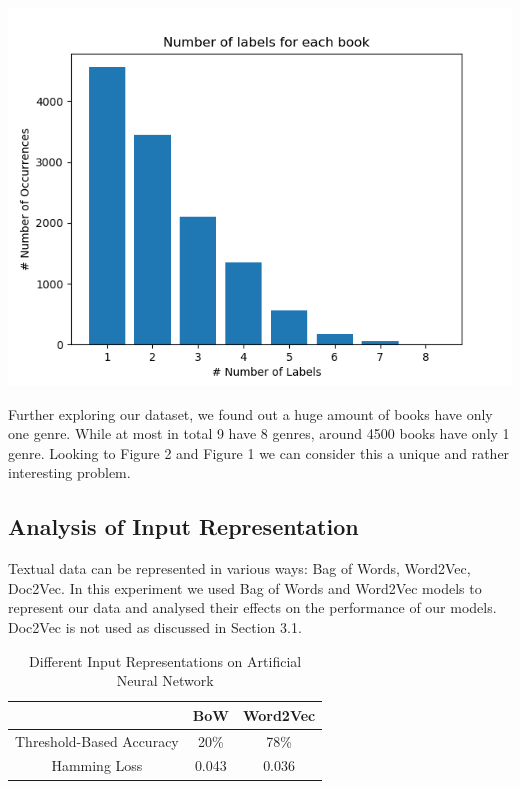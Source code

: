 \documentclass[10pt,twocolumn,letterpaper]{article}
\begin{document}
\includegraphics[width=1\linewidth]{LabelDistribution}

Further exploring our dataset, we found out a huge amount of books have only one genre. While at most in total 9 have 8 genres, around 4500 books have only 1 genre. Looking to Figure 2 and Figure 1 we can consider this a unique and rather interesting problem.

\subsection{Analysis of Input Representation}

Textual data can be represented in various ways: Bag of Words, Word2Vec, Doc2Vec. In this experiment we used Bag of Words and Word2Vec models to represent our data and analysed their effects on the performance of our models. Doc2Vec is not used as discussed in Section 3.1.\\

\begin{table}[H]
\begin{center}
\begin{tabular}{|c|c|c|}
\hline
& BoW & Word2Vec \\
\hline
Threshold-Based Accuracy & 20\% & 78\% \\
Hamming Loss & 0.043 & 0.036 \\
\hline
\end{tabular}
\end{center}
\caption{Different Input Representations on Artificial Neural Network}
\end{table}
\end{document}

